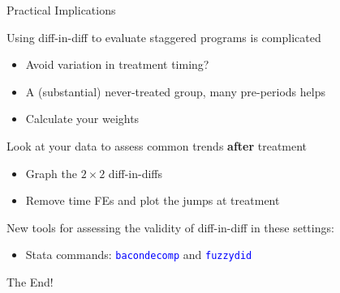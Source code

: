 \documentclass[10pt,xcolor=table,ignorenonframetext,handout,aspectratio=169]{beamer}
\newlength{\wideitemsep}
\let\olditem\item
\renewcommand{\item}{\setlength{\itemsep}{\wideitemsep}\olditem}
\begin{document}
\newpage
\begin{frame}{Practical Implications}

\medskip
Using diff-in-diff to evaluate staggered programs is complicated

\medskip
\begin{itemize}
	
	\item Avoid variation in treatment timing?
	
	\item A (substantial) never-treated group, many pre-periods helps 
	
	\item Calculate your weights
	
\end{itemize}

\pause
\medskip
\medskip
Look at your data to assess common trends \textbf{after} treatment

\medskip
\begin{itemize}
	
	\item Graph the $2\times 2$ diff-in-diffs
	
	\item Remove time FEs and plot the jumps at treatment
	
\end{itemize}

\pause
\medskip
\medskip
New tools for assessing the validity of diff-in-diff in these settings:

\medskip
\begin{itemize}
	
	\item Stata commands:  \textcolor{blue}{\texttt{bacondecomp}} and \textcolor{blue}{\texttt{fuzzydid}}
	
\end{itemize}


\end{frame}



\begin{frame}[plain]

	
	\begin{center}
		
		\Large{\textcolor{williams}{The End!}}
		
	\end{center}
	
\end{frame}
\end{document}
